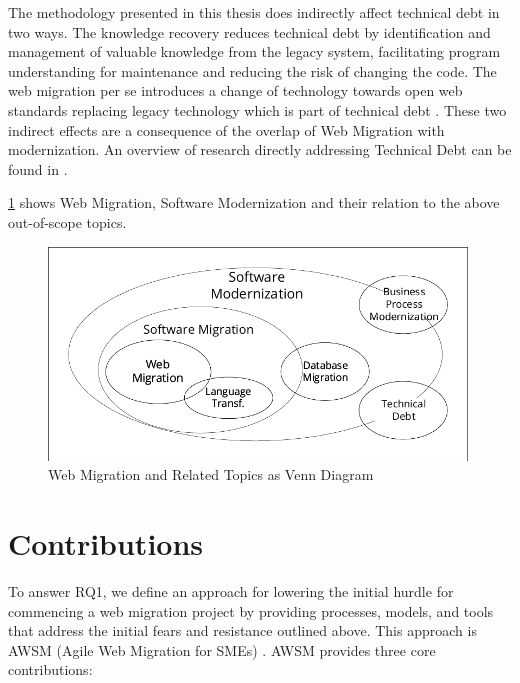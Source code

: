 \begin{itemize}
The methodology presented in this thesis does indirectly affect technical debt in two ways.
The knowledge recovery reduces technical debt by identification and management of valuable knowledge from the legacy system, facilitating program understanding for maintenance and reducing the risk of changing the code.
The web migration per se introduces a change of technology towards open web standards replacing legacy technology which is part of technical debt \autocite{Yli-Huumo2016TD}.
These two indirect effects are a consequence of the overlap of Web Migration with modernization.
An overview of research directly addressing Technical Debt can be found in \autocite{Li2015TDSMS}.
\end{itemize}

\cref{fig:modernization-migration} shows Web Migration, Software Modernization and their relation to the above out-of-scope topics.

\begin{figure}
\hypertarget{fig:modernization-migration}{%
\centering
\includegraphics[width=0.99\textwidth]{../figures/modernization-migration.pdf}
\caption{Web Migration and Related Topics as Venn Diagram}\label{fig:modernization-migration}
}
\end{figure}

\hypertarget{contributions}{%
\section{Contributions}\label{contributions}}

To answer RQ1, we define an approach for lowering the initial hurdle for commencing a web migration project by providing processes, models, and tools that address the initial fears and resistance outlined above.
This approach is AWSM (Agile Web Migration for SMEs) \autocite{Heil2016AWSM}.
AWSM provides three core contributions:

